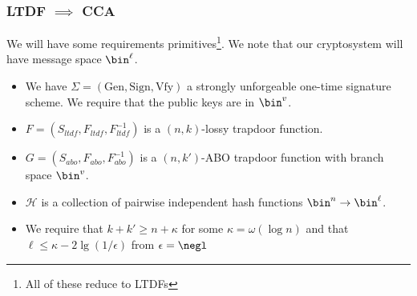\documentclass{beamer}
\begin{document}
\begin{frame}
    \frametitle{LTDF $\implies$ CCA}
    We will have some requirements primitives\footnote{All of these reduce to LTDFs}.
    We note that our cryptosystem will have message space $\bin^\ell$.
    \begin{itemize}
        \item We have $\Sigma = (\mathrm{Gen}, \mathrm{Sign}, \mathrm{Vfy})$ a strongly unforgeable one-time signature scheme. We require that the public keys are in $\bin^v$.
        \item $F = (S_{ltdf}, F_{ltdf}, F^{-1}_{ltdf})$ is a $(n, k)$-lossy trapdoor function.
        \item $G = (S_{abo}, F_{abo}, F^{-1}_{abo})$ is a $(n, k')$-ABO trapdoor function with branch space $\bin^v$.
        \item $\mathcal{H}$ is a collection of pairwise independent hash functions $\bin^n \to \bin^\ell$.
        \item We require that $k + k' \geq n + \kappa$ for some $\kappa = \omega(\log n)$ and that $\ell \leq \kappa - 2 \lg(1/\epsilon)$ from $\epsilon = \negl$
    \end{itemize}
\end{frame}
\end{document}
